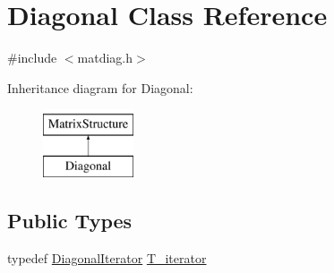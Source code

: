 \hypertarget{classDiagonal}{}\section{Diagonal Class Reference}
\label{classDiagonal}


{\ttfamily \#include $<$matdiag.\+h$>$}

Inheritance diagram for Diagonal\+:\begin{figure}[H]
\begin{center}
\leavevmode
\includegraphics[height=2.000000cm]{classDiagonal}
\end{center}
\end{figure}
\subsection*{Public Types}
\begin{DoxyCompactItemize}
\item 
typedef \hyperlink{classDiagonalIterator}{Diagonal\+Iterator} \hyperlink{classDiagonal_a10d1f6944fa52a0d07a64e82791e35ad}{T\+\_\+iterator}
\end{DoxyCompactItemize}

